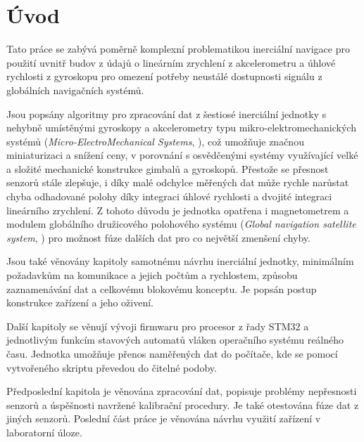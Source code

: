 \chapter*{Úvod}
{}

Tato práce se zabývá poměrně komplexní problematikou inerciální navigace pro použití uvnitř budov z údajů o lineárním zrychlení z akcelerometru a úhlové rychlosti z gyroskopu pro omezení potřeby neustálé dostupnosti signálu z globálních navigačních systémů.

Jsou popsány algoritmy pro zpracování dat z šestiosé inerciální jednotky s nehybně umístěnými gyroskopy a akcelerometry typu mikro-elektromechanických systémů (\emph{Micro-ElectroMechanical Systems}, ), což umožňuje značnou miniaturizaci a snížení ceny, v porovnání s osvědčenými systémy využívající velké a složité mechanické konstrukce gimbalů a gyroskopů. Přestože se přesnost senzorů stále zlepšuje, i díky malé odchylce měřených dat může rychle narůstat chyba odhadované polohy díky integraci úhlové rychlosti a dvojité integraci lineárního zrychlení. Z tohoto důvodu je jednotka opatřena i magnetometrem a modulem globálního družicového polohového systému (\emph{Global navigation satellite system}, ) pro možnost fúze dalších dat pro co největší zmenšení chyby.

Jsou také věnovány kapitoly samotnému návrhu inerciální jednotky, minimálním požadavkům na komunikace a jejich počtům a rychlostem, způsobu zaznamenávání dat a celkovému blokovému konceptu. Je popsán postup konstrukce zařízení a jeho oživení.

Další kapitoly se věnují vývoji firmwaru pro procesor z řady STM32 a jednotlivým funkcím stavových automatů vláken operačního systému reálného času. Jednotka umožňuje přenos naměřených dat do počítače, kde se pomocí vytvořeného skriptu převedou do čitelné podoby.

Předposlední kapitola je věnována zpracování dat, popisuje problémy nepřesnosti senzorů a úspěšnosti navržené kalibrační procedury. Je také otestována fúze dat z jiných senzorů. Poslední část práce je věnována návrhu využití zařízení v laboratorní úloze.